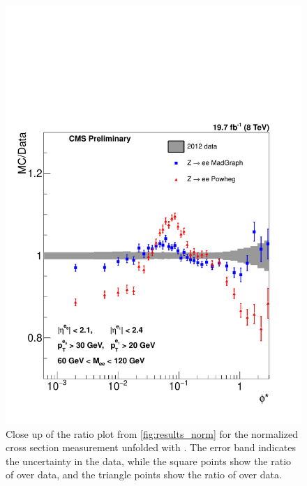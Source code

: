 \begin{figure}[!p]
    \centering
    \includegraphics[width=\textwidth]{figures/ZShape_Ratioelec_PH_Norm_Dressed.pdf}
    \caption[
        Close up of the ratio plot from \cref{fig:results_norm} for the
        normalized cross section measurement unfolded with \POWHEG.
    ]{
        Close up of the ratio plot from \cref{fig:results_norm} for the
        normalized cross section measurement unfolded with \POWHEG. The error
        band indicates the uncertainty in the data, while the square points
        show the ratio of \MADGRAPH over data, and the triangle points show the
        ratio of \POWHEG over data.
    }
    \label{fig:results_ratio_norm_powheg}
\end{figure}
